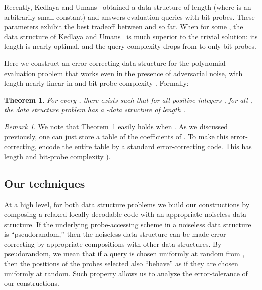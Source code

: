 \documentclass[11pt,english]{article}
\newtheorem{theorem}{Theorem}
\theoremstyle{definition}
\theoremstyle{remark}
\newtheorem*{rem}{Remark}
\begin{document}
Recently, Kedlaya and Umans~\cite{kedl-umans} obtained a data structure
of length  (where  is an arbitrarily
small constant) and answers evaluation queries with 
bit-probes. These parameters exhibit the best tradeoff
between  and  so far. When  for some ,
the data structure of Kedlaya and Umans~\cite{kedl-umans} is much superior
to the trivial solution: its length is nearly optimal, and the query complexity
drops from  to only  bit-probes.

Here we construct an error-correcting data structure for the polynomial
evaluation problem that works even in the presence of adversarial noise,
with length nearly linear in  and bit-probe complexity . Formally:

\begin{theorem}\label{thm:poly eval} For every ,
there exists  such that for all positive integers ,
for all , the data structure problem 
has a -data structure 
of length . 
\end{theorem}

\begin{rem}We note that Theorem~\ref{thm:poly eval} easily holds when
. As we discussed previously, one can just store a
table of the  coefficients of . To make this error-correcting, 
encode the entire table by a standard error-correcting code. 
This has length and bit-probe complexity ).
\end{rem}

\subsection{Our techniques\label{sub:Our-technique}}

At a high level, for both data structure problems we build
our constructions by composing a relaxed locally decodable code with
an appropriate noiseless data structure. If the underlying probe-accessing
scheme in a noiseless data structure is ``pseudorandom,'' then
the noiseless data structure can be made error-correcting by appropriate
compositions with other data structures. By pseudorandom, we mean
that if a query is chosen uniformly at random from , then the positions of the probes selected
also ``behave'' as if they are chosen uniformly at random. Such
property allows us to analyze the error-tolerance of our constructions.
\end{document}
